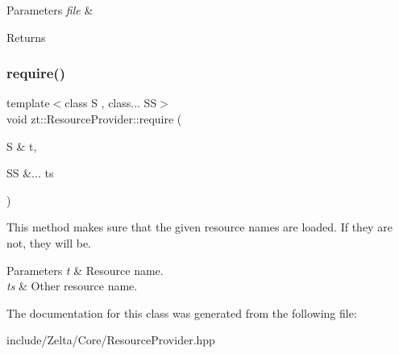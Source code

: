 \begin{DoxyParams}{Parameters}
{\em file} & \\
\hline
\end{DoxyParams}
\begin{DoxyReturn}{Returns}

\end{DoxyReturn}
\mbox{\label{classzt_1_1_resource_provider_af7a24c529d5255270e032198c985e603}} 
\subsubsection{\texorpdfstring{require()}{require()}}
{\footnotesize\ttfamily template$<$class S , class... SS$>$ \\
void zt\+::\+Resource\+Provider\+::require (\begin{DoxyParamCaption}\item[{S \&}]{t,  }\item[{SS \&...}]{ts }\end{DoxyParamCaption})\hspace{0.3cm}{\ttfamily [inline]}}



This method makes sure that the given resource names are loaded. If they are not, they will be. 


\begin{DoxyParams}{Parameters}
{\em t} & Resource name. \\
\hline
{\em ts} & Other resource name. \\
\hline
\end{DoxyParams}


The documentation for this class was generated from the following file\+:\begin{DoxyCompactItemize}
\item 
include/\+Zelta/\+Core/Resource\+Provider.\+hpp\end{DoxyCompactItemize}
